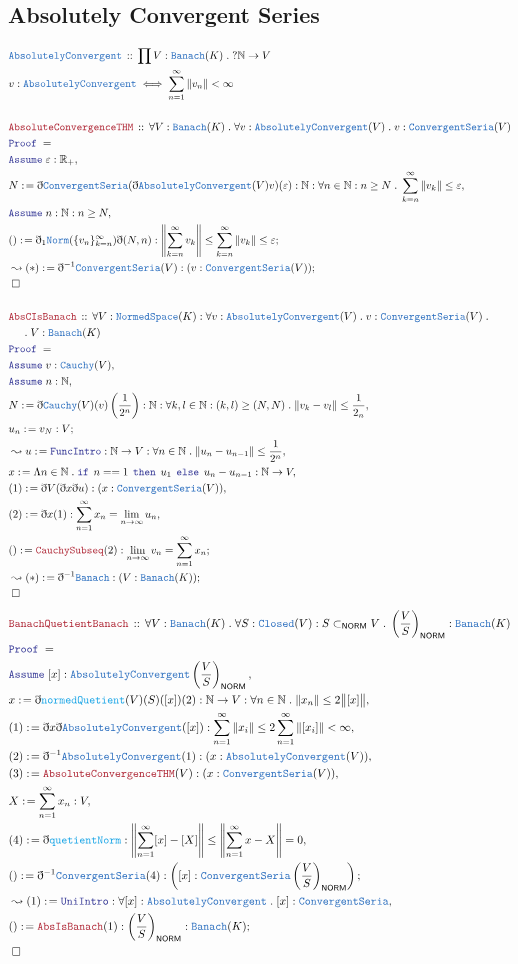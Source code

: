\documentclass[12pt]{scrartcl}
\newcommand{\TYPE}[1]{\textcolor{NavyBlue}{\mathtt{#1}}}
\newcommand{\FUNC}[1]{\textcolor{Cerulean}{\mathtt{#1}}}
\newcommand{\LOGIC}[1]{\textcolor{Blue}{\mathtt{#1}}}
\newcommand{\THM}[1]{\textcolor{Maroon}{\mathtt{#1}}}
\renewcommand{\.}{\; . \;}
\newcommand{\de}{: \kern 0.1pc =}
\newcommand{\If}{\LOGIC{if} \;}
\newcommand{\Then}{ \; \LOGIC{then} \;}
\newcommand{\Else}{\; \LOGIC{else} \;}
\newcommand{\Theorem}[2]{& \THM{#1} \, :: \, #2 \\ & \Proof = \\ }
\newcommand{\DeclareType}[2]{& \TYPE{#1} \, :: \, #2 \\}
\newcommand{\DefineType}[3]{& #1 : \TYPE{#2} \iff #3 \\}
\newcommand{\NewLine}{\\ & \kern 1pc}
\newcommand{\Page}[1]{\begin{align*} #1 \end{align*} \newpage   }
\newcommand{ \bd }{ \ByDef }
\newcommand{\Reals}{\mathbb{R} }
\newcommand{\Nat}{\mathbb{N} }
\newcommand{\Say}[3]{& #1 \de #2 : #3, \\}
\newcommand{\Conclude}[3]{& #1 \de #2 : #3; \\}
\newcommand{\Derive}[3]{& \leadsto #1 \de #2 : #3, \\}
\newcommand{\DeriveConclude}[3]{& \leadsto #1 \de #2 : #3 ; \\}
\newcommand{\A}{\LOGIC{Assume} \;}
\newcommand{\Assume}[2]{& \A #1 : #2, \\}
\newcommand{\QED}{\; \square}
\newcommand{\EndProof}{& \QED \\}
\newcommand{\ByDef}{\eth}
\newcommand{\Proof}{\LOGIC{Proof} \; }
\newcommand{\NS}{\TYPE{NormedSpace}}
\newcommand{\Banach}{\TYPE{Banach}}
\newcommand{\AbsC}{\TYPE{AbsolutelyConvergent}}
\newcommand{\NORM}{\textsf{NORM}}
\begin{document}
\subsection{Absolutely Convergent Series}
\Page{
 \DeclareType{AbsolutelyConvergent}{ \prod V : \Banach(K) \. ? \Nat \to V }
 \DefineType{v}{AbsolutelyConvergent}{\sum^\infty_{n = 1} \| v_n \| < \infty}
 \\
 \Theorem{AbsoluteConvergenceTHM}{\forall V : \Banach(K) \. \forall v : \AbsC(V) \. v : \TYPE{ConvergentSeria}(V) }
\Assume{\varepsilon}{\Reals_+}
\Say{N}{ \bd \TYPE{ConvergentSeria}( \bd \AbsC(V)v)(\varepsilon) }{ \Nat : \forall n \in \Nat : n \ge N \. \sum^\infty_{k = n } \| v_k  \| \le \varepsilon}
\Assume{n}{\Nat : n \ge N}
\Conclude{()}{\bd_1 \TYPE{Norm}( \{ v_n \}^\infty_{k = n}) \bd (N,n)}{
\left \|  \sum^\infty_{ k = n} v_k  \right \| \le \sum^\infty_{ k = n} \| v_k \|  \le \varepsilon
}
\DeriveConclude{(*)}{\bd^{-1} \TYPE{ConvergentSeria}(V)}{(v : \TYPE{ConvergentSeria}(V)) }
\EndProof
\\
\Theorem{AbsCIsBanach}{\forall V : \NS(K) : \forall v  : \AbsC(V) \.  v : \TYPE{ConvergentSeria}(V)
\.  \NewLine \. V : \Banach(K) }
\Assume{v}{\TYPE{Cauchy}(V)}
\Assume{n}{\Nat}
\Say{N}{\bd \TYPE{Cauchy}(V)(v)\left( \frac{1}{2^n} \right)}{\Nat : \forall k,l \in \Nat : (k,l)
\ge (N,N) \. \| v_k - v_l  \| \le \frac{1}{2_n}
}
\Conclude{u_n}{v_N}{V}
\Derive{u}{\LOGIC{FuncIntro}}{\Nat \to V : \forall n \in \Nat \. \| u_n - u_{n - 1} \| \le \frac{1}{2^n} }
\Say{x}{\Lambda n \in \Nat \. \If \, n == 1 \, \Then \, u_1 \, \Else \, u_n - u_{n - 1}}{\Nat \to V}
\Say{(1)}{ \bd V(\bd x \bd u) }{(x : \TYPE{ConvergentSeria}(V))}
\Say{(2)}{\bd x(1)}{ \sum^\infty_{n = 1} x_n = \lim_{n \to \infty} u_n}
\Conclude{()}{\THM{CauchySubseq}(2)}{\lim_{n \to \infty} v_n = \sum^\infty_{n = 1} x_n}
\DeriveConclude{(*)}{\bd^{-1} \Banach}{(V : \Banach(K))}
\EndProof
}
\Page{
   \Theorem{BanachQuetientBanach}{\forall V : \Banach(K) \. \forall S : \TYPE{Closed}(V) : S \subset_\NORM V \.  \left(\frac{V}{S} \right)_\NORM : \TYPE{Banach}(K)}
\Assume{[x]}{\AbsC \left( \frac{V}{S} \right)_\NORM}
\Say{x}{\bd \FUNC{normedQuetient}(V)(S)([x])(2)}{\Nat \to V : \forall n \in \Nat \. \| x_n \| \le 2 
\big\| [x] \big\|}
\Say{(1)}{ \bd x \bd \AbsC( [x] )}{ \sum^\infty_{n = 1} \| x_i \| \le 2 \sum^\infty_{n = 1} \| [x_i] \| < \infty}
\Say{(2)}{\bd^{-1} \AbsC(1)}{(x : \AbsC(V))}
\Say{(3)}{\THM{AbsoluteConvergenceTHM}(V)}{(x : \TYPE{ConvergentSeria}(V))}
\Say{X}{\sum^\infty_{n = 1} x_n}{V}
\Say{(4)}{\bd \FUNC{quetientNorm}}{ \left\| \sum^\infty_{n = 1} [x]  - [X] \right\| \le \left\| \sum^\infty_{n = 1} x  - X \right\| = 0 }
\Conclude{()}{\bd^{-1} \TYPE{ConvergentSeria}(4)}{\left([x] : \TYPE{ConvergentSeria} \left(\frac{V}{S} \right)_\NORM  \right)}
\Derive{(1)}{\LOGIC{UniIntro}}{\forall [x] : \AbsC \. [x] : \TYPE{ConvergentSeria}}
\Conclude{()}{\THM{AbsIsBanach}(1)}{ \left(\frac{V}{S} \right)_\NORM : \Banach(K) }
\EndProof
}
\end{document}
